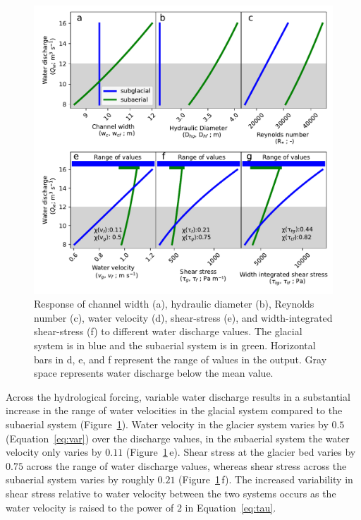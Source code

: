\documentclass[draft]{agujournal2019}
\begin{document}
  \begin{center}
    \begin{figure}[H]
      \includegraphics[width=0.7\linewidth]{model_outputs.pdf}
      \caption{Response of channel width (a), hydraulic diameter (b),  Reynolds number  (c),  water velocity (d), shear-stress (e), and width-integrated shear-stress (f)  to different water discharge values. The glacial system is in blue and the subaerial system is in green.  Horizontal bars in d, e, and f represent the range of values in the  output. Gray space represents water discharge below the mean value. }
      \label{fig:model_outs}
    \end{figure}
  \end{center}
  
  Across the hydrological forcing, variable water discharge results in a substantial increase in the range of water velocities in the glacial system compared to the subaerial system (Figure~\ref{fig:model_outs}).
  Water velocity in the glacier system varies by  $0.5$ (Equation~\ref{eq:var}) over the discharge values, in the subaerial system the water velocity only varies by $0.11$ (Figure~\ref{fig:model_outs}\,e).
  Shear stress at the glacier bed varies by $0.75$ across the range of water discharge values, whereas shear stress across the subaerial system varies by roughly $0.21$ (Figure~\ref{fig:model_outs}\,f). The increased variability in shear stress relative to water velocity between the two systems occurs as the water velocity is raised to the power of $2$ in Equation~\ref{eq:tau}. 
  
\end{document}
